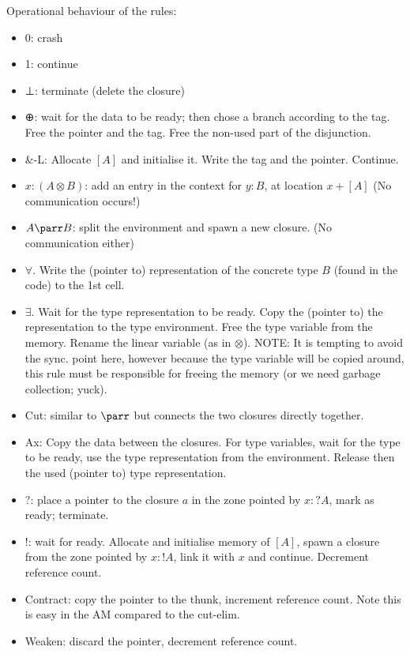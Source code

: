 \documentclass[english]{lipics-stripped}
\newcommand\layout[1]{[#1]}
\begin{document}
Operational behaviour of the rules:
\begin{itemize}
\item 0: crash
\item 1: continue
\item ⊥: terminate (delete the closure)
\item ⊕: wait for the data to be ready; then chose a branch according
  to the tag. Free the pointer and the tag.  Free the non-used part of the disjunction.
\item \&-L: Allocate $\layout A$ and initialise it. Write the tag and the pointer. Continue.
\item $x:(A ⊗ B)$: add an entry in the context for $y:B$, at location
  $x+\layout A$ (No communication occurs!)
\item $A \pa B$: split the environment and spawn a new closure. (No communication either)
\item $∀$. Write the (pointer to) representation of the concrete type $B$ (found in the code) to the 1st cell.
\item $∃$. Wait for the type representation to be ready. Copy the
  (pointer to) the representation to the type environment. Free the
  type variable from the memory. Rename the linear variable (as in
  $⊗$). NOTE: It is tempting to avoid the sync. point here, however
  because the type variable will be copied around, this rule must be
  responsible for freeing the memory (or we need garbage collection;
  yuck).
\item Cut: similar to $\pa$ but connects the two closures directly together.
\item Ax: Copy the data between the closures. For type variables, wait
  for the type to be ready, use the type representation from the
  environment. Release then the used (pointer to) type representation.
\item ?: place a pointer to the closure $a$ in the zone pointed by
  $x:?A$, mark as ready; terminate.
\item !: wait for ready. Allocate and initialise memory of $\layout A$, spawn a
  closure from the zone pointed by $x:!A$, link it with $x$ and
  continue. Decrement reference count.
\item Contract: copy the pointer to the thunk, increment reference
  count.  Note this is easy in the AM compared to the cut-elim.
\item Weaken: discard the pointer, decrement reference count.
\end{itemize}
\end{document}
